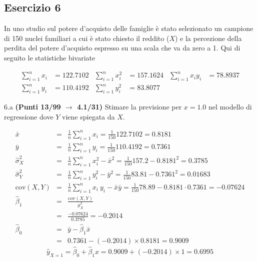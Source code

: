 \documentclass[
  11pt,
]{book}
\theoremstyle{mytheoremstyle}
\theoremstyle{mydefstyle}
\newenvironment{sol}
  {
  \begin{tcolorbox}[enhanced,breakable,arc=0.1mm,boxrule=1pt,colback=white,colframe=iblue,
  title=\bf \fontfamily{lmss}\selectfont \hspace{.5 cm} Soluzione,drop fuzzy shadow]

}{
\end{tcolorbox}
  }
\begin{document}
\subsection{Esercizio 6}\label{esercizio-6-9}

In uno studio sul potere d'acquisto delle famiglie è stato selezionato un campione di 150 nuclei familiari
a cui è stato chiesto il reddito (\(X\)) e la percezione della perdita del potere d'acquisto espresso su una scala che va da zero a 1.
Qui di seguito le statistiche bivariate

\begin{align*}
  \sum_{i=1}^n x_i &= 122.7102 &\sum_{i=1}^n x_i^2 &= 157.1624 &\sum_{i=1}^n x_i y_i &= 78.8937\\
  \sum_{i=1}^n y_i &= 110.4192 & \sum_{i=1}^n y_i^2 &= 83.8077 &
\end{align*}

6.a \textbf{(Punti 13/99 \(\rightarrow\) 4.1/31)} Stimare la previsione per \(x=1.0\) nel modello di regressione dove \(Y\) viene spiegata da \(X\).

\begin{sol}
\begin{eqnarray*}
           \bar x &=&\frac 1 n\sum_{i=1}^n x_i = \frac {1}{ 150 }  122.7102 =  0.8181 \\
           \bar y &=&\frac 1 n\sum_{i=1}^n y_i = \frac {1}{ 150 }  110.4192 =  0.7361 \\
           \hat\sigma_X^2&=&\frac 1 n\sum_{i=1}^n x_i^2-\bar x^2=\frac {1}{ 150 }  157.2  - 0.8181 ^2= 0.3785 \\
           \hat\sigma_Y^2&=&\frac 1 n\sum_{i=1}^n y_i^2-\bar y^2=\frac {1}{ 150 }  83.81  - 0.7361 ^2= 0.01683 \\
           \text{cov}(X,Y)&=&\frac 1 n\sum_{i=1}^n x_i~y_i-\bar x\bar y=\frac {1}{ 150 }  78.89 - 0.8181 \cdot 0.7361 = -0.07624 \\
           \hat\beta_1 &=& \frac{\text{cov}(X,Y)}{\hat\sigma_X^2} \\
                    &=& \frac{ -0.07624 }{ 0.3785 }  =  -0.2014 \\
           \hat\beta_0 &=& \bar y - \hat\beta_1 \bar x\\
                    &=&  0.7361 - (-0.2014) \times  0.8181 = 0.9009 
         \end{eqnarray*}\[\hat y_{X= 1 }=\hat\beta_0+\hat\beta_1 x= 0.9009 + (-0.2014) \times 1 = 0.6995 \]

\end{sol}
\end{document}
